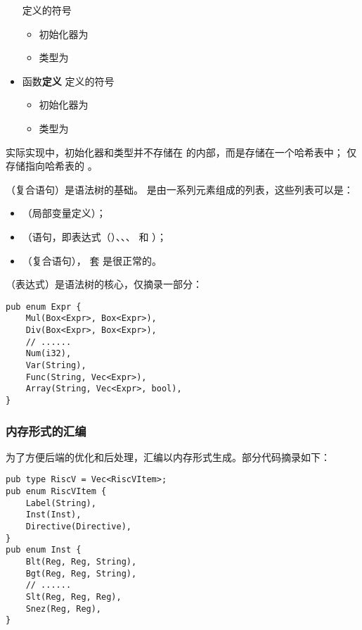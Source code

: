 \begin{itemize}
\begin{itemize}
    \end{itemize}
    定义的符号 
    \begin{itemize}
        \item 初始化器为 
        \item 类型为 
    \end{itemize}
    \item 函数\textbf{定义}  定义的符号 
    \begin{itemize}
        \item 初始化器为 
        \item 类型为 
    \end{itemize}
\end{itemize}

实际实现中，初始化器和类型并不存储在  的内部，而是存储在一个哈希表中； 仅存储指向哈希表的 。

（复合语句）是语法树的基础。 是由一系列元素组成的列表，这些列表可以是：
\begin{itemize}
    \item {}（局部变量定义）；
    \item {}（语句，即表达式（）、、、 和 ）；
    \item {}（复合语句）， 套  是很正常的。
\end{itemize}

（表达式）是语法树的核心，仅摘录一部分：
\begin{verbatim}
pub enum Expr {
    Mul(Box<Expr>, Box<Expr>),
    Div(Box<Expr>, Box<Expr>),
    // ......
    Num(i32),
    Var(String),
    Func(String, Vec<Expr>),
    Array(String, Vec<Expr>, bool),
}
\end{verbatim}
\subsubsection{内存形式的汇编}
为了方便后端的优化和后处理，汇编以内存形式生成。部分代码摘录如下：
\begin{verbatim}
pub type RiscV = Vec<RiscVItem>;
pub enum RiscVItem {
    Label(String),
    Inst(Inst),
    Directive(Directive),
}
pub enum Inst {
    Blt(Reg, Reg, String),
    Bgt(Reg, Reg, String),
    // ......
    Slt(Reg, Reg, Reg),
    Snez(Reg, Reg),
}
\end{verbatim}
